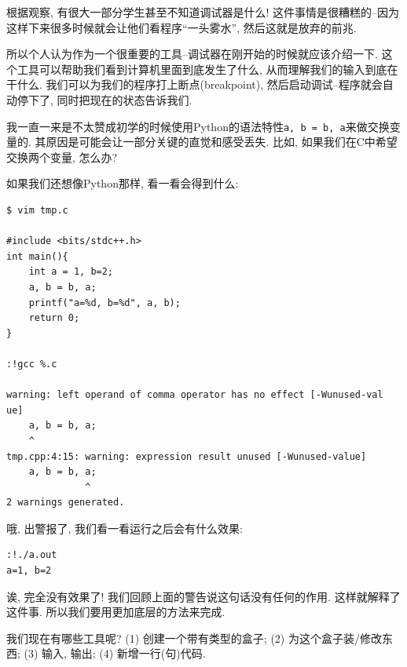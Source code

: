 \begin{tool}
	根据观察, 有很大一部分学生甚至不知道调试器是什么! 这件事情是很糟糕的--因为这样下来很多时候就会让他们看程序``一头雾水'', 然后这就是放弃的前兆. 

	所以个人认为作为一个很重要的工具--调试器在刚开始的时候就应该介绍一下. 这个工具可以帮助我们看到计算机里面到底发生了什么, 从而理解我们的输入到底在干什么. 我们可以为我们的程序打上断点(breakpoint), 然后启动调试--程序就会自动停下了, 同时把现在的状态告诉我们. 
\end{tool}



我一直一来是不太赞成初学的时候使用Python的语法特性\texttt{a, b = b, a}来做交换变量的. 其原因是可能会让一部分关键的直觉和感受丢失. 比如, 如果我们在C中希望交换两个变量, 怎么办? 

如果我们还想像Python那样, 看一看会得到什么: 

\begin{lstlisting}	
$ vim tmp.c

#include <bits/stdc++.h>
int main(){
    int a = 1, b=2; 
    a, b = b, a;
    printf("a=%d, b=%d", a, b);
    return 0;
}

:!gcc %.c

warning: left operand of comma operator has no effect [-Wunused-val
ue]
    a, b = b, a;
    ^
tmp.cpp:4:15: warning: expression result unused [-Wunused-value]
    a, b = b, a;
              ^
2 warnings generated.
\end{lstlisting}

哦, 出警报了, 我们看一看运行之后会有什么效果: 

\begin{lstlisting}
:!./a.out
a=1, b=2
\end{lstlisting}

诶, 完全没有效果了! 我们回顾上面的警告说这句话没有任何的作用. 这样就解释了这件事. 所以我们要用更加底层的方法来完成. 

我们现在有哪些工具呢? (1) 创建一个带有类型的盒子; (2) 为这个盒子装/修改东西; (3) 输入, 输出; (4) 新增一行(句)代码. 










